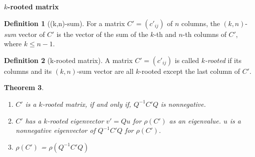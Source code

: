 \documentclass{beamer}
\theoremstyle{plain}
\newtheorem{thm}{Theorem}[section]
\theoremstyle{definition}
\newtheorem{defn}[thm]{Definition}
\begin{document}
\begin{frame}{\bf $k$-rooted matrix}

\begin{defn}[(k,n)-sum]
For a matrix $C'=(c'_{ij})$ of $n$ columns, the $(k, n)$-{\it sum} vector of $C'$ is the vector of the sum of the $k$-th and  $n$-th columns of $C'$, where $k\leq n-1$.
\end{defn}

\begin{defn}[k-rooted matrix]
A  matrix $C'=(c'_{ij})$ is called {\it $k$-rooted}  if its  columns and its $(k, n)$-sum vector are all $k$-rooted except the last column of $C'$.
\end{defn}

\end{frame}

\begin{frame}

\begin{thm}
    \begin{enumerate}
        \item[(i)]$C'$ is a $k$-rooted matrix, if and only if, $Q^{-1}C'Q$ is nonnegative.
        \item[(ii)]$C'$ has a $k$-rooted eigenvector $v'=Qu$ for $\rho(C')$ as an eigenvalue. $u$ is a nonnegative eigenvector of $Q^{-1}C'Q$ for $\rho(C')$.
        \item[(iii)] $\rho(C')$ = $\rho(Q^{-1}C'Q)$
    \end{enumerate}
\end{thm}

\end{frame}
\end{document}
